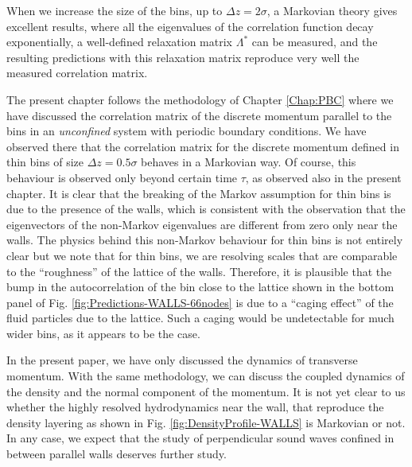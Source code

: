 \documentclass[b5paper,openright,11pt]{book}
\begin{document}
When we  increase the  size of  the bins, up  to $\Delta  z=2\sigma$, a
Markovian theory gives excellent results, where all the eigenvalues of
the   correlation  function   decay   exponentially,  a   well-defined
relaxation  matrix  $\Lambda^*$ can  be  measured,  and the  resulting
predictions  with  this  relaxation  matrix reproduce  very  well  the
measured correlation matrix.

The present chapter follows the  methodology of Chapter \ref{Chap:PBC}  where we
have  discussed  the  correlation  matrix  of  the  discrete  momentum
parallel to  the bins in  an \textit{unconfined} system  with periodic
boundary  conditions.  We  have  observed there  that the  correlation
matrix for the discrete momentum defined  in thin bins of size $\Delta
z= 0.5\sigma$ behaves in a Markovian way. Of course, this behaviour is
observed  only beyond  certain time  $\tau$, as  observed also  in the
present chapter.  It is clear that the breaking of the Markov assumption
for thin bins is due to the presence of the walls, which is consistent
with  the   observation  that  the  eigenvectors   of  the  non-Markov
eigenvalues are different  from zero only near the  walls. The physics
behind this non-Markov  behaviour for thin bins is  not entirely clear
but  we note  that for  thin bins,  we are  resolving scales  that are
comparable   to   the   ``roughness''    of   the   lattice   of   the
walls. Therefore, it is plausible that the bump in the autocorrelation
of the  bin close  to the lattice  shown in the  bottom panel  of Fig.
\ref{fig:Predictions-WALLS-66nodes} is  due to a  ``caging effect'' of the  fluid particles 
due to the lattice. Such a caging would be undetectable for much wider
bins, as it appears to be the case.

In  the  present  paper,  we  have  only  discussed  the  dynamics  of
transverse momentum.   With the same  methodology, we can  discuss the
coupled  dynamics of  the  density  and the  normal  component of  the
momentum.   It is  not yet  clear to  us whether  the highly  resolved
hydrodynamics near  the wall, that  reproduce the density  layering as
shown in  Fig.  \ref{fig:DensityProfile-WALLS} is  Markovian or  not. In any  case, we
expect that the study of perpendicular sound waves confined in between
parallel walls deserves further study.
\end{document}
